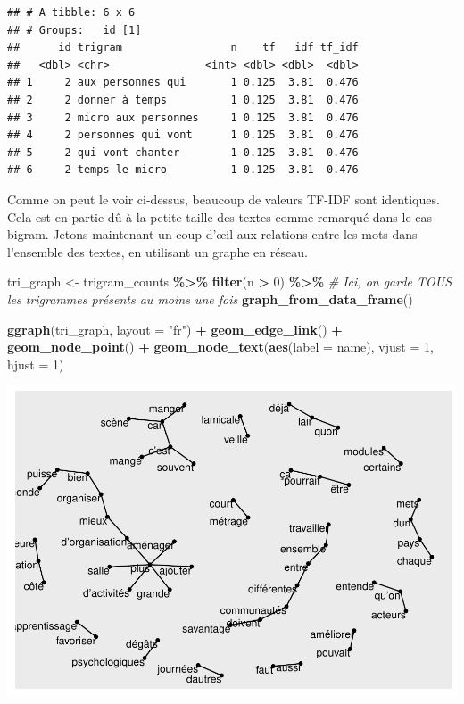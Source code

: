 \documentclass[
]{article}
\newenvironment{Shaded}{\begin{snugshade}}{\end{snugshade}}
\newcommand{\AttributeTok}[1]{\textcolor[rgb]{0.13,0.29,0.53}{#1}}
\newcommand{\CommentTok}[1]{\textcolor[rgb]{0.56,0.35,0.01}{\textit{#1}}}
\newcommand{\DecValTok}[1]{\textcolor[rgb]{0.00,0.00,0.81}{#1}}
\newcommand{\FunctionTok}[1]{\textcolor[rgb]{0.13,0.29,0.53}{\textbf{#1}}}
\newcommand{\NormalTok}[1]{#1}
\newcommand{\OtherTok}[1]{\textcolor[rgb]{0.56,0.35,0.01}{#1}}
\newcommand{\SpecialCharTok}[1]{\textcolor[rgb]{0.81,0.36,0.00}{\textbf{#1}}}
\newcommand{\StringTok}[1]{\textcolor[rgb]{0.31,0.60,0.02}{#1}}
\begin{document}
\begin{verbatim}
## # A tibble: 6 x 6
## # Groups:   id [1]
##      id trigram                 n    tf   idf tf_idf
##   <dbl> <chr>               <int> <dbl> <dbl>  <dbl>
## 1     2 aux personnes qui       1 0.125  3.81  0.476
## 2     2 donner à temps          1 0.125  3.81  0.476
## 3     2 micro aux personnes     1 0.125  3.81  0.476
## 4     2 personnes qui vont      1 0.125  3.81  0.476
## 5     2 qui vont chanter        1 0.125  3.81  0.476
## 6     2 temps le micro          1 0.125  3.81  0.476
\end{verbatim}

Comme on peut le voir ci-dessus, beaucoup de valeurs TF-IDF sont
identiques. Cela est en partie dû à la petite taille des textes comme
remarqué dans le cas bigram. Jetons maintenant un coup d'œil aux
relations entre les mots dans l'ensemble des textes, en utilisant un
graphe en réseau.

\begin{Shaded}
\begin{Highlighting}[]
\NormalTok{tri\_graph }\OtherTok{\textless{}{-}}\NormalTok{ trigram\_counts }\SpecialCharTok{\%\textgreater{}\%}
  \FunctionTok{filter}\NormalTok{(n }\SpecialCharTok{\textgreater{}} \DecValTok{0}\NormalTok{) }\SpecialCharTok{\%\textgreater{}\%} \CommentTok{\# Ici, on garde TOUS les trigrammes présents au moins une fois}
  \FunctionTok{graph\_from\_data\_frame}\NormalTok{()}

\FunctionTok{ggraph}\NormalTok{(tri\_graph, }\AttributeTok{layout =} \StringTok{"fr"}\NormalTok{) }\SpecialCharTok{+}
  \FunctionTok{geom\_edge\_link}\NormalTok{() }\SpecialCharTok{+}
  \FunctionTok{geom\_node\_point}\NormalTok{() }\SpecialCharTok{+}
  \FunctionTok{geom\_node\_text}\NormalTok{(}\FunctionTok{aes}\NormalTok{(}\AttributeTok{label =}\NormalTok{ name), }\AttributeTok{vjust =} \DecValTok{1}\NormalTok{, }\AttributeTok{hjust =} \DecValTok{1}\NormalTok{)}
\end{Highlighting}
\end{Shaded}

\includegraphics{Texte_mining_files/figure-latex/unnamed-chunk-27-1.pdf}
\end{document}
